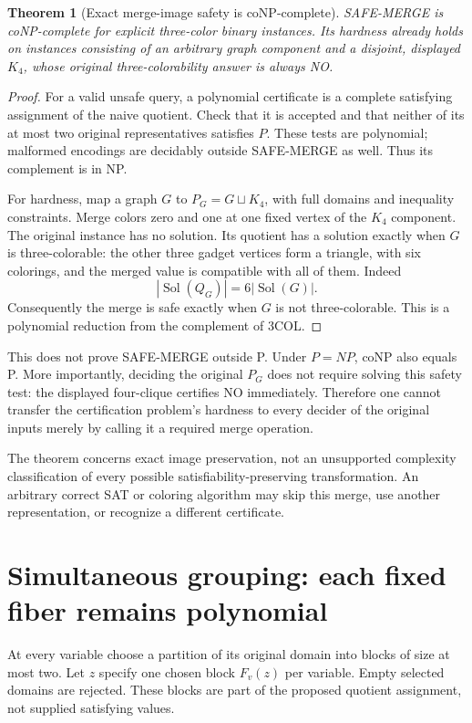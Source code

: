 \documentclass[11pt]{article}
\newtheorem{theorem}{Theorem}
\newcommand{\Sol}{\operatorname{Sol}}
\begin{document}
\begin{theorem}[Exact merge-image safety is coNP-complete]\label{thm:safe}
SAFE-MERGE is coNP-complete for explicit three-color binary instances. Its
hardness already holds on instances consisting of an arbitrary graph
component and a disjoint, displayed $K_4$, whose original three-colorability
answer is always NO.
\end{theorem}
\begin{proof}
For a valid unsafe query, a polynomial certificate is a complete satisfying
assignment of the naive quotient. Check that it is accepted and that neither
of its at most two original representatives satisfies $P$. These tests are
polynomial; malformed encodings are decidably outside SAFE-MERGE as well.
Thus its complement is in NP.

For hardness, map a graph $G$ to $P_G=G\sqcup K_4$, with full domains and
inequality constraints. Merge colors zero and one at one fixed vertex of
the $K_4$ component. The original instance has no solution. Its quotient
has a solution exactly when $G$ is three-colorable: the other three gadget
vertices form a triangle, with six colorings, and the merged value is
compatible with all of them. Indeed
\[
                         |\Sol(Q_G)|=6|\Sol(G)|.
\]
Consequently the merge is safe exactly when $G$ is not three-colorable.
This is a polynomial reduction from the complement of 3COL.
\end{proof}

This does not prove SAFE-MERGE outside P. Under $P=NP$, coNP also equals P.
More importantly, deciding the original $P_G$ does not require solving this
safety test: the displayed four-clique certifies NO immediately. Therefore
one cannot transfer the certification problem's hardness to every decider
of the original inputs merely by calling it a required merge operation.

The theorem concerns exact image preservation, not an unsupported complexity
classification of every possible satisfiability-preserving transformation.
An arbitrary correct SAT or coloring algorithm may skip this merge, use
another representation, or recognize a different certificate.

\section{Simultaneous grouping: each fixed fiber remains polynomial}
At every variable choose a partition of its original domain into blocks of
size at most two. Let $z$ specify one chosen block $F_v(z)$ per variable.
Empty selected domains are rejected. These blocks are part of the proposed
quotient assignment, not supplied satisfying values.
\end{document}
